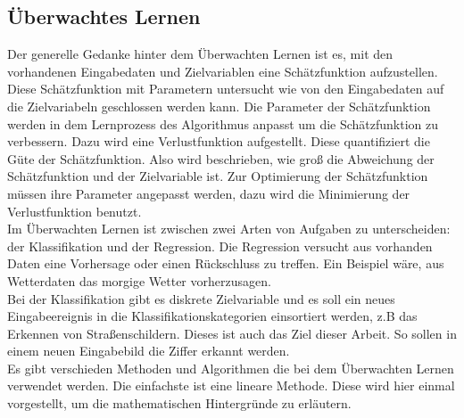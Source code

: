 \subsection{Überwachtes Lernen}
Der generelle Gedanke hinter dem Überwachten Lernen ist es, mit den vorhandenen Eingabedaten und Zielvariablen eine Schätzfunktion aufzustellen.  Diese Schätzfunktion mit Parametern untersucht wie von den Eingabedaten auf die Zielvariabeln geschlossen werden kann.  Die Parameter der Schätzfunktion werden in dem Lernprozess des Algorithmus anpasst um die Schätzfunktion zu verbessern.  Dazu wird eine Verlustfunktion aufgestellt.  Diese quantifiziert  die Güte der Schätzfunktion. Also wird beschrieben, wie groß die Abweichung der Schätzfunktion und der Zielvariable ist. Zur Optimierung der Schätzfunktion müssen ihre Parameter angepasst werden, dazu wird die Minimierung der Verlustfunktion benutzt.\\
Im Überwachten Lernen ist zwischen zwei Arten von Aufgaben zu unterscheiden: der Klassifikation und der Regression.  Die Regression versucht aus vorhanden Daten eine Vorhersage oder einen Rückschluss zu treffen.  Ein Beispiel wäre,  aus Wetterdaten das morgige Wetter vorherzusagen.  \\
Bei der Klassifikation gibt es diskrete Zielvariable und es soll ein neues Eingabeereignis in die Klassifikationskategorien einsortiert werden,  z.B das Erkennen von Straßenschildern. Dieses ist auch das Ziel dieser Arbeit. So sollen in einem neuen Eingabebild die Ziffer erkannt werden.\\
Es gibt verschieden Methoden und Algorithmen die bei dem Überwachten Lernen verwendet werden.  Die einfachste ist eine lineare Methode.  Diese wird hier einmal vorgestellt,  um die mathematischen Hintergründe zu erläutern.

